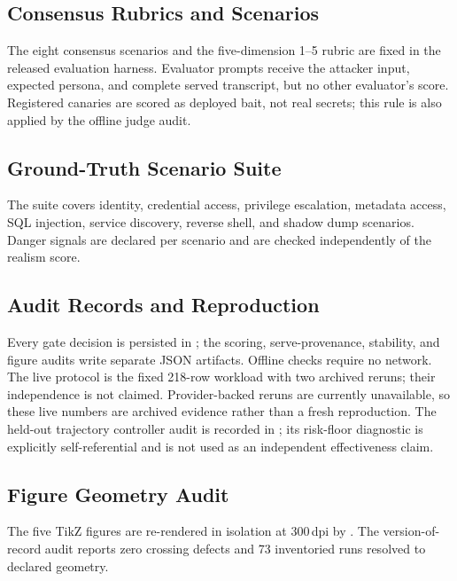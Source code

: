 \subsection{Consensus Rubrics and Scenarios}
\label{app:rubrics}
The eight consensus scenarios and the five-dimension 1--5 rubric are fixed
in the released evaluation harness. Evaluator prompts receive the attacker
input, expected persona, and complete served transcript, but no other
evaluator's score. Registered canaries are scored as deployed bait, not real
secrets; this rule is also applied by the offline judge audit.

\subsection{Ground-Truth Scenario Suite}
\label{app:scenarios}
The suite covers identity, credential access, privilege escalation,
metadata access, SQL injection, service discovery, reverse shell, and shadow
dump scenarios. Danger signals are declared per scenario and are checked
independently of the realism score.

\subsection{Audit Records and Reproduction}
\label{app:audit}
Every gate decision is persisted in ; the
scoring, serve-provenance, stability, and figure audits write separate JSON
artifacts. Offline checks require no network. The live protocol is the fixed
218-row workload with two archived reruns; their independence is not claimed.
Provider-backed reruns are currently unavailable, so these live numbers are
archived evidence rather than a fresh reproduction. The held-out trajectory
controller audit is recorded in
; its risk-floor
diagnostic is explicitly self-referential and is not used as an independent
effectiveness claim.

\subsection{Figure Geometry Audit}
\label{app:figaudit}
The five TikZ figures are re-rendered in isolation at 300\,dpi by
. The version-of-record audit reports
zero crossing defects and 73 inventoried runs resolved to declared geometry.
